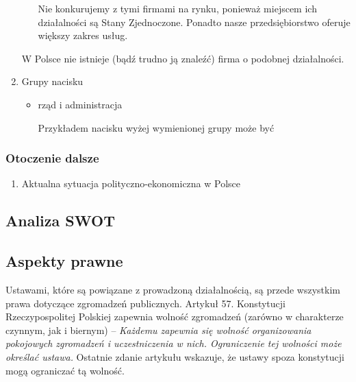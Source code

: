 \documentclass{article}
\begin{document}
\begin{enumerate}
\begin{itemize}
	Nie konkurujemy z tymi firmami na rynku, ponieważ miejscem ich działalności są Stany Zjednoczone. Ponadto nasze przedsiębiorstwo oferuje większy zakres usług.
	
	\end{itemize}
	W Polsce nie istnieje (bądź trudno ją znaleźć) firma o podobnej działalności.
	
	
\item Grupy nacisku
	\begin{itemize}
	\item rząd i administracja
	
	Przykładem nacisku wyżej wymienionej grupy może być 
	\end{itemize}

\end{enumerate}



\subsubsection{Otoczenie dalsze} %
\begin{enumerate}
\item Aktualna sytuacja polityczno-ekonomiczna w Polsce
\end{enumerate}


\subsection{Analiza SWOT}
\subsection{Aspekty prawne}
Ustawami, które są powiązane z prowadzoną działalnością, są przede wszystkim prawa dotyczące zgromadzeń publicznych. Artykuł 57. Konstytucji Rzeczypospolitej Polskiej zapewnia wolność zgromadzeń (zarówno w charakterze czynnym, jak i biernym) -- \textit{Każdemu zapewnia się wolność organizowania pokojowych zgromadzeń i uczestniczenia w nich. Ograniczenie tej wolności może określać ustawa.} Ostatnie zdanie artykułu wskazuje, że ustawy spoza konstytucji mogą ograniczać tą wolność. 
\end{document}
